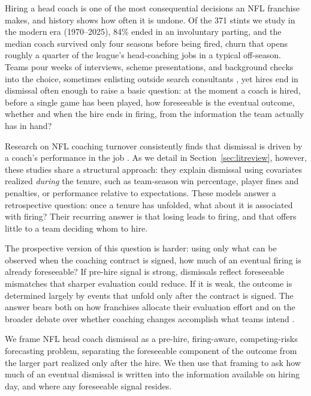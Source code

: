 \documentclass[USenglish]{article}
\theoremstyle{dgthm}
\theoremstyle{dgdef}
\begin{document}
Hiring a head coach is one of the most consequential decisions an NFL franchise makes, and history shows how often it is undone. Of the 371 stints we study in the modern era (1970--2025), 84\% ended in an involuntary parting, and the median coach survived only four seasons before being fired, churn that opens roughly a quarter of the league's head-coaching jobs in a typical off-season. Teams pour weeks of interviews, scheme presentations, and background checks into the choice, sometimes enlisting outside search consultants \citep{perez2025, brandt2026}, yet hires end in dismissal often enough to raise a basic question: at the moment a coach is hired, before a single game has been played, how foreseeable is the eventual outcome, whether and when the hire ends in firing, from the information the team actually has in hand?

Research on NFL coaching turnover consistently finds that dismissal is driven by a coach's performance in the job \citep{allen2012, salaga2020, foreman2019, farnell2021}. As we detail in Section~\ref{sec:litreview}, however, these studies share a structural approach: they explain dismissal using covariates realized \emph{during} the tenure, such as team-season win percentage, player fines and penalties, or performance relative to expectations. These models answer a retrospective question: once a tenure has unfolded, what about it is associated with firing? Their recurring answer is that losing leads to firing, and that offers little to a team deciding whom to hire.

The prospective version of this question is harder: using only what can be observed when the coaching contract is signed, how much of an eventual firing is already foreseeable? If pre-hire signal is strong, dismissals reflect foreseeable mismatches that sharper evaluation could reduce. If it is weak, the outcome is determined largely by events that unfold only after the contract is signed. The answer bears both on how franchises allocate their evaluation effort and on the broader debate over whether coaching changes accomplish what teams intend \citep{bryson2024}.

We frame NFL head coach dismissal as a pre-hire, firing-aware, competing-risks forecasting problem, separating the foreseeable component of the outcome from the larger part realized only after the hire. We then use that framing to ask how much of an eventual dismissal is written into the information available on hiring day, and where any foreseeable signal resides.
\end{document}
